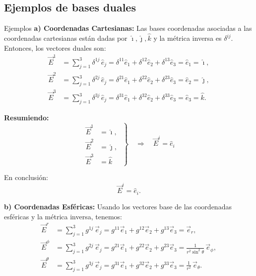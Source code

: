\documentclass[../apunte_mecanica_clasica.tex]{subfiles}%
\begin{document}
\newpage

\subsection{Ejemplos de bases duales}

\begin{apuntebloque}{Ejemplos}
\textbf{a) Coordenadas Cartesianas:} Las bases coordenadas asociadas a las coordenadas cartesianas están dadas por 
$\hat{\imath}, \hat{\jmath}, \hat{k}$ y la métrica inversa es $\delta^{ij}$.  
Entonces, los vectores duales son:
\begin{align*}
    \vec{E}^1 &= \sum_{j=1}^3 \delta^{1j}\, \hat{e}_j 
    = \delta^{11}\hat{e}_1 + \delta^{12}\hat{e}_2 + \delta^{13}\hat{e}_3 
    = \hat{e}_1 = \hat{\imath}, \\[6pt]
    \vec{E}^2 &= \sum_{j=1}^3 \delta^{2j}\, \hat{e}_j 
    = \delta^{21}\hat{e}_1 + \delta^{22}\hat{e}_2 + \delta^{23}\hat{e}_3 
    = \hat{e}_2 = \hat{\jmath}, \\[6pt]
    \vec{E}^3 &= \sum_{j=1}^3 \delta^{3j}\, \hat{e}_j 
    = \delta^{31}\hat{e}_1 + \delta^{32}\hat{e}_2 + \delta^{33}\hat{e}_3 
    = \hat{e}_3 = \hat{k}.
\end{align*}

\textbf{Resumiendo:}
\begin{equation*}
\left.
\begin{aligned}
    \vec{E}^1 &= \hat{\imath}, \\
    \vec{E}^2 &= \hat{\jmath}, \\
    \vec{E}^3 &= \hat{k}
\end{aligned}
\;\right\}
\quad \Rightarrow \quad \vec{E}^i = \hat{e}_i
\end{equation*}

En conclusión: 
\begin{equation*}
    \vec{E}^i = \hat{e}_i.
\end{equation*}

\textbf{b) Coordenadas Esféricas:} Usando los vectores base de las coordenadas esféricas y la métrica inversa, tenemos:
\begin{align*}
    \vec{E}^r &= \sum_{j=1}^3 g^{1j}\, \vec{e}_j 
              = g^{11}\vec{e}_1 + g^{12}\vec{e}_2 + g^{13}\vec{e}_3 
              = \vec{e}_r, \\[6pt]
    \vec{E}^\phi &= \sum_{j=1}^3 g^{2j}\, \vec{e}_j 
              = g^{21}\vec{e}_1 + g^{22}\vec{e}_2 + g^{23}\vec{e}_3 
              = \frac{1}{r^2 \sin^2\theta}\,\vec{e}_\phi, \\[6pt]
    \vec{E}^\theta &= \sum_{j=1}^3 g^{3j}\, \vec{e}_j 
              = g^{31}\vec{e}_1 + g^{32}\vec{e}_2 + g^{33}\vec{e}_3 
              = \frac{1}{r^2}\,\vec{e}_\theta.
\end{align*}


\end{apuntebloque}
\end{document}
